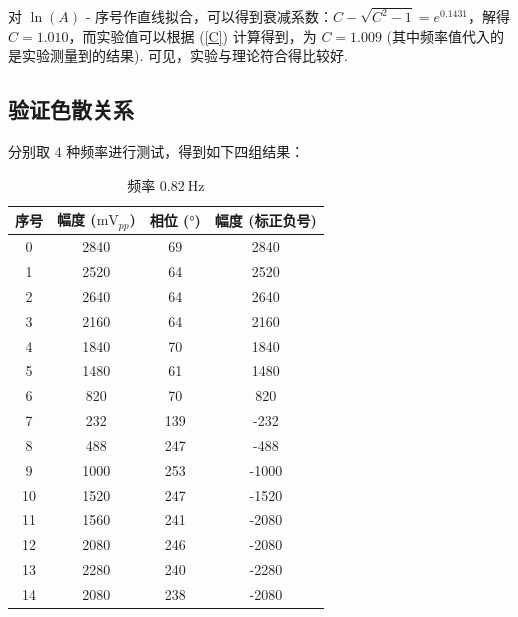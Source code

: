\documentclass{customDoc}
\begin{document}
\vspace{-15pt}

对 $\ln(A)$ - 序号作直线拟合，可以得到衰减系数：$C-\sqrt{C^2-1} = e^{0.1431}$，解得 $C = 1.010$，而实验值可以根据 (\ref{C}) 计算得到，为 $C = 1.009$ (其中频率值代入的是实验测量到的结果). 可见，实验与理论符合得比较好.

\subsection{验证色散关系}

分别取 4 种频率进行测试，得到如下四组结果：

\vspace{-10pt}

\hspace{-60pt}
\parbox{0.6\textwidth}{
\begin{longtable}{|c|c|c|c|}
  \caption{频率 $\SI{0.82}{\hertz}$} \\
    \hline
    序号    & 幅度 ($\si{\milli\volt}_{pp}$) & 相位 ($\si{\degree}$) & 幅度 (标正负号) \\
    \hline
    0     & 2840  & 69    & 2840 \\
    \hline
    1     & 2520  & 64    & 2520 \\
    \hline
    2     & 2640  & 64    & 2640 \\
    \hline
    3     & 2160  & 64    & 2160 \\
    \hline
    4     & 1840  & 70    & 1840 \\
    \hline
    5     & 1480  & 61    & 1480 \\
    \hline
    6     & 820   & 70    & 820 \\
    \hline
    7     & 232   & 139   & -232 \\
    \hline
    8     & 488   & 247   & -488 \\
    \hline
    9     & 1000  & 253   & -1000 \\
    \hline
    10    & 1520  & 247   & -1520 \\
    \hline
    11    & 1560  & 241   & -2080 \\
    \hline
    12    & 2080  & 246   & -2080 \\
    \hline
    13    & 2280  & 240   & -2280 \\
    \hline
    14    & 2080  & 238   & -2080 \\
    \hline
\end{longtable}
}
\end{document}
